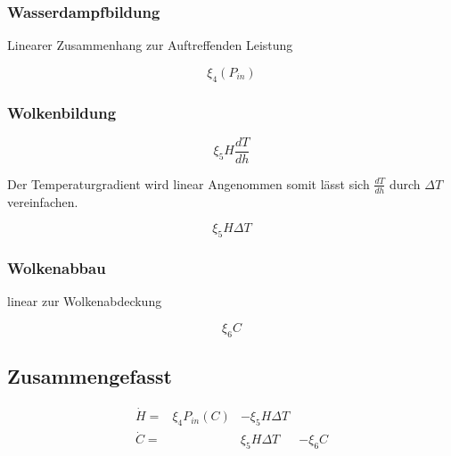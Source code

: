 \begin{refsection}
\subsubsection{Wasserdampfbildung}

Linearer Zusammenhang zur Auftreffenden Leistung

\begin{equation}
\xi_4 (P_{in})
\end{equation}

\subsubsection{Wolkenbildung}

\begin{equation}
\xi_5 H \frac{dT}{dh}
\end{equation}

Der Temperaturgradient wird linear Angenommen somit lässt sich $\frac{dT}{dh}$ durch $\Delta T $ vereinfachen. 

\begin{equation}
\xi_5 H \Delta T
\end{equation}

\subsubsection{Wolkenabbau}

linear zur Wolkenabdeckung

\begin{equation}
\xi_6 C
\end{equation}

\subsection{Zusammengefasst}

\begin{equation}
	\begin{matrix}			
		\dot{H} = & \xi_4 P_{in}(C) & - \xi_5 H \Delta T & \\
		\dot{C} = &                 &   \xi_5 H \Delta T & - \xi_6 C
	\end{matrix}	
\end{equation}



\end{refsection}
